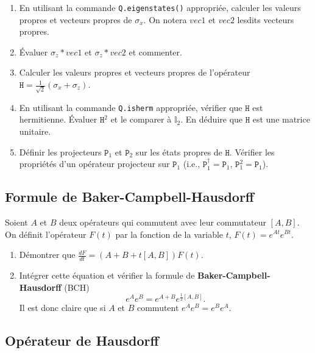 \begin{enumerate}
\item En utilisant la commande \texttt{Q.eigenstates()} appropriée, calculer les 
valeurs propres et vecteurs propres de $\sigma_x$. On notera $vec1$ et $vec2$ 
lesdits vecteurs propres.

\item Évaluer $\sigma_z*vec1$ et $\sigma_z*vec2$ et commenter.

\item Calculer les valeurs propres et vecteurs propres de l'opérateur
$\mathtt{H} = \frac{1}{\sqrt{2}} (\sigma_x+\sigma_z)$.

\item En utilisant  la commande \texttt{Q.isherm} appropriée, vérifier que 
$\mathtt{H}$ est hermitienne. Évaluer $\mathtt{H}^2$ et le comparer à 
$\mathbb{I}_2$. En déduire que $\mathtt{H}$ est une matrice unitaire.

\item Définir les projecteurs $\mathtt{P}_1$ et $\mathtt{P}_2$ sur les états
propres de $\mathtt{H}$. Vérifier les propriétés d'un opérateur projecteur sur
$\mathtt{P}_1$ (i.e., $\mathtt{P}_1^{\dag}=\mathtt{P}_1$,
$\mathtt{P}_1^2=\mathtt{P}_1$).
\end{enumerate}

\subsection{Formule de Baker-Campbell-Hausdorff}

\label{sec:BCH1} Soient $A$ et $B$ deux opérateurs qui commutent avec leur
commutateur $[A,B]$. On définit l'opérateur $F(t)$ par la fonction de la
variable $t$, $F(t)=e^{At}e^{Bt}$.

\begin{enumerate}
\item Démontrer que $\frac{dF}{dt}=(A+B+t[A,B])F(t)$.

\item Intégrer cette équation et vérifier la formule de
\textbf{Baker-Campbell-Hausdorff}  (BCH)
\begin{equation}
e^{A}e^{B}=e^{A+B}e^{\frac{1}{2}[A,B]}.
\end{equation}
Il est donc claire que si $A$ et $B$ commutent $e^{A}e^{B}=e^{B}e^{A}$.
\end{enumerate}

\subsection{Opérateur de Hausdorff}

